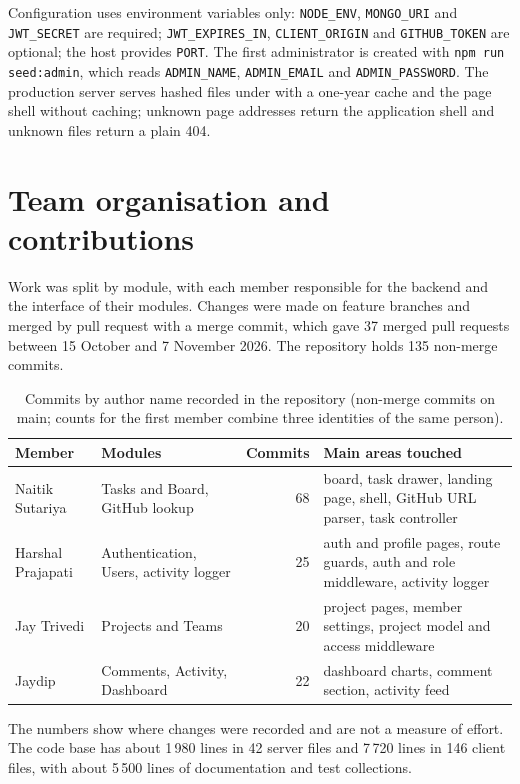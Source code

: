 \documentclass[11pt,a4paper]{article}
\newcommand{\code}[1]{\texttt{#1}}
\begin{document}
Configuration uses environment variables only: \code{NODE\_ENV}, \code{MONGO\_URI} and \code{JWT\_SECRET} are required; \code{JWT\_EXPIRES\_IN}, \code{CLIENT\_ORIGIN} and \code{GITHUB\_TOKEN} are optional; the host provides \code{PORT}. The first administrator is created with \code{npm run seed:admin}, which reads \code{ADMIN\_NAME}, \code{ADMIN\_EMAIL} and \code{ADMIN\_PASSWORD}. The production server serves hashed files under  with a one-year cache and the page shell without caching; unknown page addresses return the application shell and unknown files return a plain 404.

\section{Team organisation and contributions}
Work was split by module, with each member responsible for the backend and the interface of their modules. Changes were made on feature branches and merged by pull request with a merge commit, which gave 37 merged pull requests between 15 October and 7 November 2026. The repository holds 135 non-merge commits.

\begin{table}[H]
\centering\small
\begin{tabular}{@{}p{3.1cm}p{4.1cm}rp{5.2cm}@{}}
\toprule
\textbf{Member} & \textbf{Modules} & \textbf{Commits} & \textbf{Main areas touched}\\
\midrule
Naitik Sutariya & Tasks and Board, GitHub lookup & 68 & board, task drawer, landing page, shell, GitHub URL parser, task controller\\
Harshal Prajapati & Authentication, Users, activity logger & 25 & auth and profile pages, route guards, auth and role middleware, activity logger\\
Jay Trivedi & Projects and Teams & 20 & project pages, member settings, project model and access middleware\\
Jaydip & Comments, Activity, Dashboard & 22 & dashboard charts, comment section, activity feed\\
\bottomrule
\end{tabular}
\caption{Commits by author name recorded in the repository (non-merge commits on main; counts for the first member combine three identities of the same person).}
\end{table}

The numbers show where changes were recorded and are not a measure of effort. The code base has about 1\,980 lines in 42 server files and 7\,720 lines in 146 client files, with about 5\,500 lines of documentation and test collections.
\end{document}
